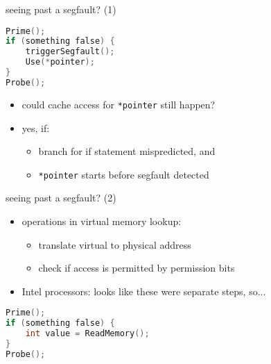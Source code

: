 \begin{frame}[fragile]{seeing past a segfault? (1)}
\begin{lstlisting}[language=C,style=small]
Prime();
if (something false) {
    triggerSegfault();
    Use(*pointer);
}
Probe();
\end{lstlisting}
\begin{itemize}
\item could cache access for \texttt{*pointer} still happen?
\item yes, if:
    \begin{itemize}
    \item branch for if statement mispredicted, and
    \item \texttt{*pointer} starts before segfault detected
    \end{itemize}
\end{itemize}
\end{frame}

\begin{frame}[fragile]{seeing past a segfault? (2)}
\begin{itemize}
\item operations in virtual memory lookup:
    \begin{itemize}
    \item translate virtual to physical address
    \item check if access is permitted by permission bits
    \end{itemize}
\item Intel processors: looks like these were separate steps, so...
\end{itemize}
\begin{lstlisting}[language=C,style=small]
Prime();
if (something false) {
    int value = ReadMemory();
}
Probe();
\end{lstlisting}
\end{frame}
